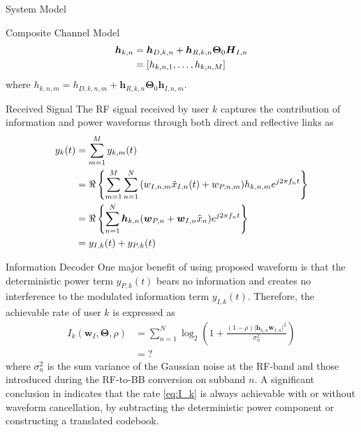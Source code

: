 \documentclass{IEEEtran}
\begin{document}
\begin{section} {System Model}
\begin{subsection}	{Composite Channel Model}
		\begin{equation}	\label{eq:h_{k,n}}
			\begin{split}
				\boldsymbol{h}_{k,n}
				&=\boldsymbol{h}_{D,k,n}+\boldsymbol{h}_{R,k,n}\boldsymbol{\Theta}_0\boldsymbol{H}_{I,n}	\\
				&=[h_{k,n,1},\dots,h_{k,n,M}]
			\end{split}
		\end{equation}
		where $h_{k,n,m}=h_{D,k,n,m}+\boldsymbol{h}_{R,k,n}\boldsymbol{\Theta}_0\boldsymbol{h}_{I,n,m}$.
	\end{subsection}

	\begin{subsection}	{Received Signal}
		The RF signal received by user $k$ captures the contribution of information and power waveforms through both direct and reflective links as
		\begin{equation}	\label{eq:y_{k}(t)}
			\begin{split}
				y_{k}(t)
				&=\sum_{m=1}^M{y_{k,m}(t)}	\\
				&=\Re\left\{\sum_{m=1}^M{\sum_{n=1}^N{(w_{I,n,m}\tilde{x}_{I,n}(t)+w_{P,n,m})h_{k,n,m}e^{j2{\pi}{f_n}t}}}\right\}	\\
				&=\Re\left\{\sum_{n=1}^N{\boldsymbol{h}_{k,n}(\boldsymbol{w}_{P,n}+\boldsymbol{w}_{I,n}\tilde{x}_n)e^{j2{\pi}{f_n}t}}\right\}	\\
				&=y_{I,k}(t)+y_{P,k}(t)
			\end{split}
		\end{equation}
	\end{subsection}

	\begin{subsection}	{Information Decoder}
		One major benefit of using proposed waveform is that the deterministic power term $y_{P,k}(t)$ bears no information and creates no interference to the modulated information term $y_{I,k}(t)$. Therefore, the achievable rate of user $k$ is expressed as
		\begin{equation}	\label{eq:I_k}
			\begin{split}
				I_k(\boldsymbol{w}_I,\boldsymbol{\Theta},\rho)
				&=\sum_{n=1}^N{\log_2\left(1+\frac{(1-\rho)\lvert\boldsymbol{h}_{k,n}\boldsymbol{w}_{I,n}\rvert^2}{\sigma_n^2}\right)}	\\
				&=?
			\end{split}
		\end{equation}
		where $\sigma_n^2$ is the sum variance of the Gaussian noise at the RF-band and those introduced during the RF-to-BB conversion on subband $n$. A significant conclusion in \cite{Clerckx2018b} indicates that the rate \ref{eq:I_k} is always achievable with or without waveform cancellation, by subtracting the deterministic power component or constructing a translated codebook.
	\end{subsection}


\end{section}
\end{document}
